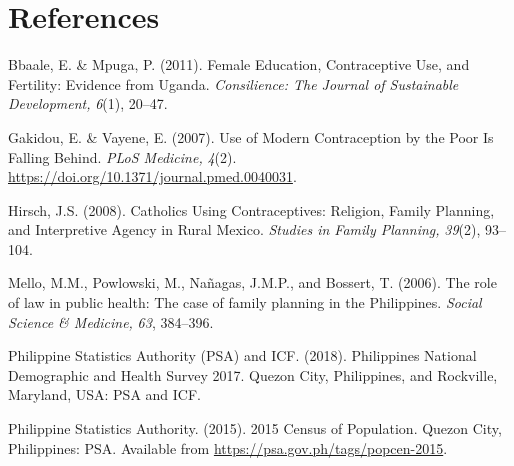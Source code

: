 \documentclass[12pt]{article}
\begin{document}
\section{References}
\begin{enumerate}[label={[\arabic*]}]
    \item Bbaale, E. \& Mpuga, P. (2011). Female Education, Contraceptive Use, and Fertility: Evidence from Uganda. \textit{Consilience: The Journal of Sustainable Development,} \textit{6}(1), 20--47.
    \item Gakidou, E. \& Vayene, E. (2007). Use of Modern Contraception by the Poor Is Falling Behind. \textit{PLoS Medicine,} \textit{4}(2). \url{https://doi.org/10.1371/journal.pmed.0040031}.
    \item Hirsch, J.S. (2008). Catholics Using Contraceptives: Religion, Family Planning, and Interpretive Agency in Rural Mexico. \textit{Studies in Family Planning,} \textit{39}(2), 93--104.
    \item Mello, M.M., Powlowski, M., Nañagas, J.M.P., and Bossert, T. (2006). The role of law in public health: The case of family planning in the Philippines. \textit{Social Science \& Medicine,} \textit{63}, 384--396.
    \item Philippine Statistics Authority (PSA) and ICF. (2018). Philippines National Demographic and Health Survey 2017. Quezon City, Philippines, and Rockville, Maryland, USA: PSA and ICF.
    \item Philippine Statistics Authority. (2015). 2015 Census of Population. Quezon City, Philippines: PSA. Available from \url{https://psa.gov.ph/tags/popcen-2015}.
\end{enumerate}


\pagebreak
\end{document}
